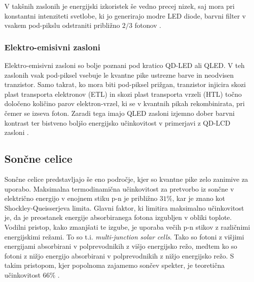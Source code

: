 \documentclass[twoside,11pt]{article}
\begin{document}
V takšnih zaslonih je energijski izkoristek še vedno precej nizek, saj mora pri konstantni intenziteti svetlobe, ki jo generirajo modre LED diode, barvni filter v 
vsakem pod-pikslu odstraniti približno $2/3$ fotonov \cite{https://doi.org/10.1002/anie.202004857}.

\subsubsection{Elektro-emisivni zasloni}
Elektro-emisivni zasloni so bolje poznani pod kratico QD-LED ali QLED. V teh zaslonih vsak pod-piksel vsebuje le kvantne pike ustrezne barve in neodvisen tranzistor. Samo takrat, ko mora biti pod-piksel prižgan, tranzistor injicira skozi plast transporta elektronov (ETL) in skozi plast transporta vrzeli (HTL) točno določeno
količino parov elektron-vrzel, ki se v kvantnih pikah rekombinirata, pri čemer se izseva foton. Zaradi tega imajo QLED zasloni
izjemno dober barvni kontrast ter bistveno boljšo energijsko učinkovitost v primerjavi z QD-LCD zasloni \cite{https://doi.org/10.1002/anie.202004857}.

\subsection{Sončne celice}
Sončne celice predstavljajo še eno področje, kjer so kvantne pike zelo zanimive za uporabo. Maksimalna termodinamična učinkovitost za pretvorbo iz sončne v električno energijo v enojnem stiku p-n je približno $31\%$, kar je znano kot Shockley-Queisserjeva limita. 
Glavni faktor, ki limitira maksimalno učinkovitost je, da je preostanek energije absorbiranega fotona izgubljen v obliki toplote. Vodilni pristop, kako zmanjšati te izgube, je uporaba večih p-n
stikov z različnimi energijskimi režami. To so t.i. \textit{multi-junction solar cells}. Tako so fotoni z višjimi energijami absorbirani v polprevodnikih z višjo energijsko režo, medtem ko so fotoni z nižjo energijo absorbirani v polprevodnikih z 
nižjo energijsko režo. S takim pristopom, kjer popolnoma zajamemo sončev spekter, je teoretična učinkovitost $66\%$ \cite{NOZIK2002115}.
\end{document}
